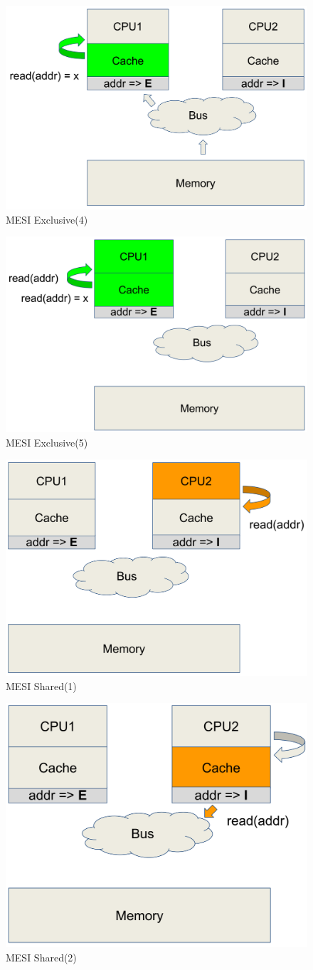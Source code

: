 \documentclass[10pt,a4paper,oneside,titlepage]{article}
\theoremstyle{plain}
\theoremstyle{defenition}
\begin{document}
\begin{figure}[h!]
	\centering
	\includegraphics[width=0.4\linewidth]{pictures/MESI5}
	\caption{MESI Exclusive(4)}
	\label{fig:mesi5}
\end{figure}

\begin{figure}[h!]
	\centering
	\includegraphics[width=0.4\linewidth]{pictures/MESI6}
	\caption{MESI Exclusive(5)}
	\label{fig:mesi6}
\end{figure}

\begin{figure}[h!]
	\centering
	\includegraphics[width=0.4\linewidth]{pictures/MESI7}
	\caption{MESI Shared(1)}
	\label{fig:mesi7}
\end{figure}

\begin{figure}[h!]
	\centering
	\includegraphics[width=0.4\linewidth]{pictures/MESI8}
	\caption{MESI Shared(2)}
	\label{fig:mesi8}
\end{figure}
\end{document}
